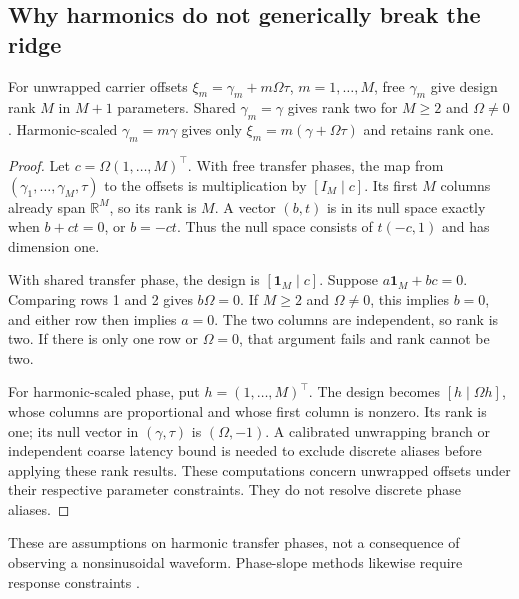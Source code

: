 \documentclass[submission,nolinenumbers]{esj}
\newcommand{\R}{\mathbb R}
\begin{document}
\subsection{Why harmonics do not generically break the ridge}\label{sec:harmonics}
\begin{proposition}\label{prop:harmonic}
For unwrapped carrier offsets $\xi_m=\gamma_m+m\Omega\tau$, $m=1,\ldots,M$, free $\gamma_m$ give design rank $M$ in $M+1$ parameters. Shared $\gamma_m=\gamma$ gives rank two for $M\ge2$ and $\Omega\ne0$. Harmonic-scaled $\gamma_m=m\gamma$ gives only $\xi_m=m(\gamma+\Omega\tau)$ and retains rank one.
\end{proposition}
\begin{proof}
Let $c=\Omega(1,\ldots,M)^\top$. With free transfer phases, the map from $(\gamma_1,\ldots,\gamma_M,\tau)$ to the offsets is multiplication by $[I_M\mid c]$. Its first $M$ columns already span $\R^M$, so its rank is $M$. A vector $(b,t)$ is in its null space exactly when $b+ct=0$, or $b=-ct$. Thus the null space consists of $t(-c,1)$ and has dimension one.

With shared transfer phase, the design is $[\mathbf1_M\mid c]$. Suppose $a\mathbf1_M+bc=0$. Comparing rows 1 and 2 gives $b\Omega=0$. If $M\ge2$ and $\Omega\ne0$, this implies $b=0$, and either row then implies $a=0$. The two columns are independent, so rank is two. If there is only one row or $\Omega=0$, that argument fails and rank cannot be two.

For harmonic-scaled phase, put $h=(1,\ldots,M)^\top$. The design becomes $[h\mid\Omega h]$, whose columns are proportional and whose first column is nonzero. Its rank is one; its null vector in $(\gamma,\tau)$ is $(\Omega,-1)$. A calibrated unwrapping branch or independent coarse latency bound is needed to exclude discrete aliases before applying these rank results. These computations concern unwrapped offsets under their respective parameter constraints. They do not resolve discrete phase aliases.
\end{proof}
These are assumptions on harmonic transfer phases, not a consequence of observing a nonsinusoidal waveform. Phase-slope methods likewise require response constraints \citep{nolte2008}.
\end{document}
